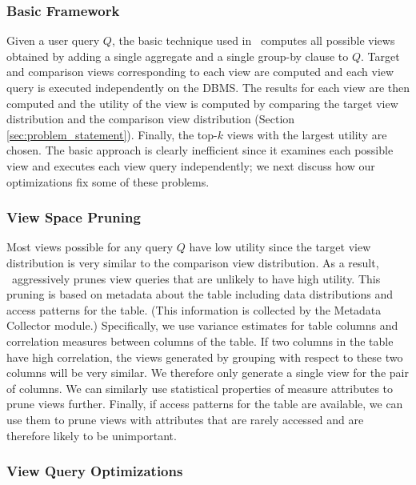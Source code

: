 \subsubsection{Basic Framework}
\label{subsubsec:basic_framework}

Given a user query $Q$, the basic technique used in \SeeDB\ computes all
possible views obtained by adding a single aggregate and a single group-by
clause to $Q$. Target and comparison views corresponding to each view are
computed and each view query is executed independently on the DBMS. The
results for each view are then computed and the utility of the view is
computed by comparing the target view distribution and the comparison view
distribution (Section \ref{sec:problem_statement}). Finally, the top-$k$ views
with the largest utility are chosen. The basic approach is clearly inefficient
since it examines each possible view and executes each view query independently;
we next discuss how our optimizations fix some of these problems.

\subsubsection{View Space Pruning}
\label{subsubsec:view_space_pruning}

Most views possible for any query $Q$ have low utility since the target view
distribution is very similar to the comparison view distribution. 
As a result,
\SeeDB\ aggressively prunes view queries that are unlikely to have high
utility. 
This pruning is based on metadata about the table including data
distributions and access patterns for the table. (This information is collected
by the Metadata Collector module.)
 Specifically, we use variance estimates for
table columns and correlation measures between columns of the table. 
If two columns in the table have high correlation, the views generated by grouping with respect to these two
columns will be very similar. 
We therefore only generate a single view for the
pair of columns. 
We can similarly use statistical properties of measure
attributes to prune views further. 
Finally, if access patterns for the table are
available, we can use them to prune views with attributes that are
rarely accessed and are therefore likely to be unimportant.

\subsubsection{View Query Optimizations}
\label{subsubsec:optimizations}

